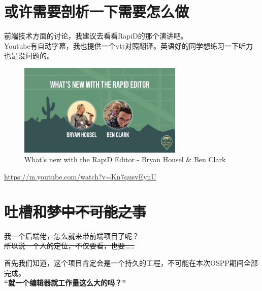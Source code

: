 \documentclass{beamer}
\begin{document}



\section{或许需要剖析一下需要怎么做}

\begin{frame}
    前端技术方面的讨论，我建议去看看RapiD的那个演讲吧。\\
    Youtube有自动字幕，我也提供一个vtt对照翻译。英语好的同学想练习一下听力也是没问题的。 \\
    

    \begin{figure}[H]
        \centering
        \includegraphics[width=0.7\textwidth]{figure/youtube-Kn7qusvEynU.jpg}
        \caption{What's new with the RapiD Editor - Bryan Housel \& Ben Clark}
    \end{figure}

    \url{https://m.youtube.com/watch?v=Kn7qusvEynU}
\end{frame}

\section{吐槽和\sout{梦中不可能之事}}

\begin{frame}
    \Large
    \sout{我一个后端佬，怎么就来带前端项目了呢？}\\
    \sout{所以说一个人的定位，不仅要看，也要……}
\end{frame}

\begin{frame}
    \large
    \quad \quad 首先我们知道，这个项目肯定会是一个持久的工程，不可能在本次OSPP期间全部完成。\\
    \vspace{4em}
    \quad \quad \textbf{“就一个编辑器就工作量这么大的吗？”}
\end{frame}
\end{document}
